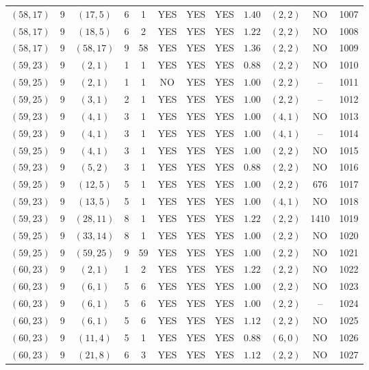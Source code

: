\begin{longtable}{|c|c|c|c|c|c|c|c|c|c|c|c|}
$(58,17)$ & 9 & $(17,5)$ & 6 & 1 & YES & YES & YES & $1.40$ & $(2,2)$ & NO & 1007\\
$(58,17)$ & 9 & $(18,5)$ & 6 & 2 & YES & YES & YES & $1.22$ & $(2,2)$ & NO & 1008\\
$(58,17)$ & 9 & $(58,17)$ & 9 & 58 & YES & YES & YES & $1.36$ & $(2,2)$ & NO & 1009\\
$(59,23)$ & 9 & $(2,1)$ & 1 & 1 & YES & YES & YES & $0.88$ & $(2,2)$ & NO & 1010\\
$(59,25)$ & 9 & $(2,1)$ & 1 & 1 & NO & YES & YES & $1.00$ & $(2,2)$ & -- & 1011\\
$(59,25)$ & 9 & $(3,1)$ & 2 & 1 & YES & YES & YES & $1.00$ & $(2,2)$ & -- & 1012\\
$(59,23)$ & 9 & $(4,1)$ & 3 & 1 & YES & YES & YES & $1.00$ & $(4,1)$ & NO & 1013\\
$(59,23)$ & 9 & $(4,1)$ & 3 & 1 & YES & YES & YES & $1.00$ & $(4,1)$ & -- & 1014\\
$(59,25)$ & 9 & $(4,1)$ & 3 & 1 & YES & YES & YES & $1.00$ & $(2,2)$ & NO & 1015\\
$(59,23)$ & 9 & $(5,2)$ & 3 & 1 & YES & YES & YES & $0.88$ & $(2,2)$ & NO & 1016\\
$(59,25)$ & 9 & $(12,5)$ & 5 & 1 & YES & YES & YES & $1.00$ & $(2,2)$ & 676 & 1017\\
$(59,23)$ & 9 & $(13,5)$ & 5 & 1 & YES & YES & YES & $1.00$ & $(4,1)$ & NO & 1018\\
$(59,23)$ & 9 & $(28,11)$ & 8 & 1 & YES & YES & YES & $1.22$ & $(2,2)$ & 1410 & 1019\\
$(59,25)$ & 9 & $(33,14)$ & 8 & 1 & YES & YES & YES & $1.00$ & $(2,2)$ & NO & 1020\\
$(59,25)$ & 9 & $(59,25)$ & 9 & 59 & YES & YES & YES & $1.00$ & $(2,2)$ & NO & 1021\\
$(60,23)$ & 9 & $(2,1)$ & 1 & 2 & YES & YES & YES & $1.22$ & $(2,2)$ & NO & 1022\\
$(60,23)$ & 9 & $(6,1)$ & 5 & 6 & YES & YES & YES & $1.00$ & $(2,2)$ & NO & 1023\\
$(60,23)$ & 9 & $(6,1)$ & 5 & 6 & YES & YES & YES & $1.00$ & $(2,2)$ & -- & 1024\\
$(60,23)$ & 9 & $(6,1)$ & 5 & 6 & YES & YES & YES & $1.12$ & $(2,2)$ & NO & 1025\\
$(60,23)$ & 9 & $(11,4)$ & 5 & 1 & YES & YES & YES & $0.88$ & $(6,0)$ & NO & 1026\\
$(60,23)$ & 9 & $(21,8)$ & 6 & 3 & YES & YES & YES & $1.12$ & $(2,2)$ & NO & 1027\\

\end{longtable}
